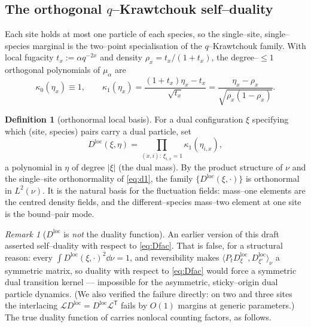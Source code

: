\documentclass[11pt]{article}
\theoremstyle{plain}
\theoremstyle{definition}
\newtheorem{definition}[theorem]{Definition}
\theoremstyle{remark}
\newtheorem{remark}[theorem]{Remark}
\newcommand{\cL}{\mathcal L}\newcommand{\cO}{\mathcal O}\newcommand{\cE}{\mathcal E}
\begin{document}
\subsection{The orthogonal \texorpdfstring{$q$}{q}--Krawtchouk self--duality}
Each site holds at most one particle of each species, so the single--site,
single--species marginal is the two--point specialisation of the $q$--Krawtchouk
family. With local fugacity $t_x:=\alpha q^{-2x}$ and density $\rho_x=t_x/(1+t_x)$,
the degree--$\le1$ orthogonal polynomials of $\mu_\alpha$ are
\begin{equation}\label{eq:d1}
  \kappa_0(\eta_x)\equiv1,\qquad
  \kappa_1(\eta_x)=\frac{(1+t_x)\eta_x-t_x}{\sqrt{t_x}}
  =\frac{\eta_x-\rho_x}{\sqrt{\rho_x(1-\rho_x)}}.
\end{equation}

\begin{definition}[orthonormal local basis]\label{def:D}
For a dual configuration $\xi$ specifying which (site, species) pairs carry a dual
particle, set
\begin{equation}\label{eq:Dfac}
  D^{\mathrm{loc}}(\xi,\eta)=\prod_{(x,i):\,\xi_{i,x}=1}\kappa_1(\eta_{i,x}),
\end{equation}
a polynomial in $\eta$ of degree $|\xi|$ (the dual mass). By the product structure of
$\nu$ and the single--site orthonormality of \eqref{eq:d1}, the family
$\{D^{\mathrm{loc}}(\xi,\cdot)\}$ is orthonormal in $L^2(\nu)$. It is the natural
basis for the fluctuation fields: mass--one elements are the centred density fields,
and the different--species mass--two element at one site is the bound--pair mode.
\end{definition}

\begin{remark}[$D^{\mathrm{loc}}$ is \emph{not} the duality function]\label{rem:norm}
An earlier version of this draft asserted self--duality with respect to
\eqref{eq:Dfac}. That is false, for a structural reason: every
$\int D^{\mathrm{loc}}(\xi,\cdot)^2\dd\nu=1$, and reversibility makes
$\langle P_tD^{\mathrm{loc}}_\xi,D^{\mathrm{loc}}_{\xi'}\rangle_\nu$ a symmetric
matrix, so duality with respect to \eqref{eq:Dfac} would force a symmetric dual
transition kernel --- impossible for the asymmetric, sticky--origin dual particle
dynamics. (We also verified the failure directly: on two and three sites the
interlacing $\cL D^{\mathrm{loc}}=D^{\mathrm{loc}}\cL^{\mathsf T}$ fails by $O(1)$
margins at generic parameters.) The true duality function of \cite{REU} carries
nonlocal counting factors, as follows.
\end{remark}
\end{document}
